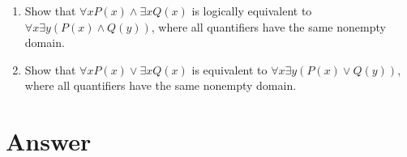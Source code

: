 \documentclass{sig-alternate-05-2015}
\begin{document}
\begin{enumerate}
\item Show that $\forall x P(x) \wedge \exists x Q(x)$ is logically equivalent
to $\forall x \exists y (P(x) \wedge Q(y))$, where all quantifiers have
the same nonempty domain.

\item Show that $\forall xP(x) \vee \exists x Q(x)$ is equivalent to $\forall x \exists y
(P(x) \vee Q(y))$, where all quantifiers have the same
nonempty domain.
\end{enumerate}

\nocite{*}

 
\newpage
\appendix
\section{Answer}
\end{document}
